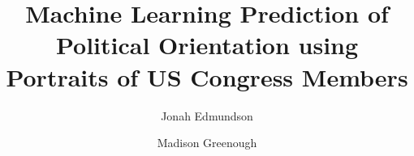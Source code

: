 \documentclass[manuscript,screen,review]{acmart}
\newcommand{\commentt}[1]{}
\begin{document}


\title{Machine Learning Prediction of Political Orientation using Portraits of US Congress Members}

\commentt{ %
The dataset constructed for this analysis was obtained from Facebook. Facebook profile IDs were scraped from new members of 2 Facebook ``Groups'': republicans from \href{https://www.facebook.com/groups/RU4TX/}{Republicans in Texas}, and democrats from \href{https://www.facebook.com/groups/111188856119651/}{Democratic Voices for Biden/Harris 2024}. The python API wrapper \href{https://github.com/kevinzg/facebook-scraper}{\texttt{facebook-scraper}} was used to obtain URLs to each user's profile picture. Then, profile pictures were scanned for faces and cropped to a common size of 120 x 120 pixels using the Haar Cascades facial detection algorithm.

Assumptions of the following analysis due to the method of dataset construction are as follows:

\begin{itemize}
\item ``Democrats'' and ``republicans'' are good proxies for ``liberal'' and ``conservative'', respectively. 
\item Democrats/republicans on Facebook are representative of democrats and republicans in general. 
\item Users that set profiles pictures of themselves versus of a non-face picture do not have different facial attributes. 
\end{itemize}
} %


\author{Jonah Edmundson}
\author{Madison Greenough}
\authornotemark[1]


\renewcommand{\shortauthors}{Edmundson and Greenough}
\end{document}
